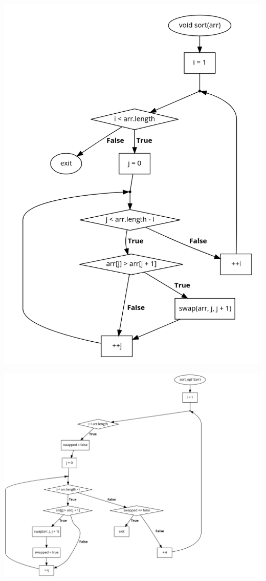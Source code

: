 \documentclass[11pt]{article}
\begin{document}
\begin{center}
    \includegraphics[scale=0.6]{sort_flow.png}\\
\end{center}
\pagebreak
\begin{center}
    \includegraphics[scale=0.5]{sort_opt_flow.png}\\
\end{center}
\pagebreak
\end{document}
